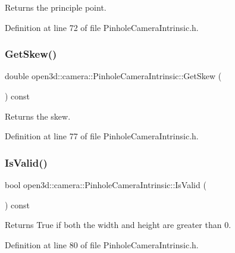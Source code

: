 Returns the principle point. 



Definition at line 72 of file Pinhole\+Camera\+Intrinsic.\+h.

\mbox{\label{classopen3d_1_1camera_1_1_pinhole_camera_intrinsic_accab078a4c27093d472d2d24d81f207f}} 
\subsubsection{\texorpdfstring{GetSkew()}{GetSkew()}}
{\footnotesize\ttfamily double open3d\+::camera\+::\+Pinhole\+Camera\+Intrinsic\+::\+Get\+Skew (\begin{DoxyParamCaption}{ }\end{DoxyParamCaption}) const\hspace{0.3cm}{\ttfamily [inline]}}



Returns the skew. 



Definition at line 77 of file Pinhole\+Camera\+Intrinsic.\+h.

\mbox{\label{classopen3d_1_1camera_1_1_pinhole_camera_intrinsic_a6aa462077d44464a0e0f7641e3539b8c}} 
\subsubsection{\texorpdfstring{IsValid()}{IsValid()}}
{\footnotesize\ttfamily bool open3d\+::camera\+::\+Pinhole\+Camera\+Intrinsic\+::\+Is\+Valid (\begin{DoxyParamCaption}{ }\end{DoxyParamCaption}) const\hspace{0.3cm}{\ttfamily [inline]}}



Returns True if both the width and height are greater than 0. 



Definition at line 80 of file Pinhole\+Camera\+Intrinsic.\+h.

